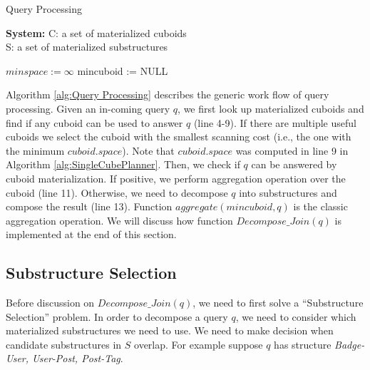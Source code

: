 \begin{algorithm}[H]
\label{alg:Query Processing}
\caption{Query Processing}
\LinesNumbered
\textbf{System:} C: a set of materialized cuboids\\ S: a set of materialized substructures\\

$minspace:= \infty $\;
mincuboid := NULL\;
\end{algorithm}

Algorithm \ref{alg:Query Processing} describes the generic work flow of query processing. Given an in-coming query $q$,
we first look up materialized cuboids and find if any cuboid can be used to answer $q$ (line 4-9). If there are multiple useful cuboids we select the cuboid with the smallest scanning cost (i.e., the one with the minimum $cuboid.space$). Note that $cuboid.space$ was computed in line 9 in Algorithm \ref{alg:SingleCubePlanner}. Then, we check if $q$ can be answered by cuboid materialization. If positive, we perform aggregation operation over the cuboid (line 11). Otherwise, we need to decompose $q$ into substructures and compose the result (line 13). Function $aggregate(mincuboid, q)$ is the classic aggregation operation. We will discuss how function $Decompose\_Join(q)$ is implemented at the end of this section.

\subsection{Substructure Selection}
\label{Substructure Selection}

Before discussion on $Decompose\_Join(q)$, we need to first solve a ``Substructure Selection'' problem. In order to decompose a query $q$, we need to consider which materialized substructures we need to use. We need to make decision when candidate substructures in $S$ overlap. For example suppose $q$ has structure \textit{Badge-User, User-Post, Post-Tag}.

